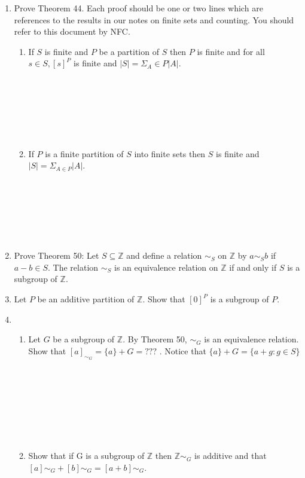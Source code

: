 \documentclass[11pt]{article}
\begin{document}
\begin{enumerate}
\newpage %
\item Prove Theorem 44. Each proof should be one or two lines which are references to the results in our notes on finite sets and counting. You should refer to this document by NFC.
\begin{enumerate}
\item If $S$ is finite and $P$ be a partition of $S$ then $P$ is finite and for all $s \in S, [s]^P$ is finite and $|S| = \Sigma_A \in P|A|$.
\\
\\
\\
\\
\\
\\
\\

\item If $P$ is a finite partition of $S$ into finite sets then $S$ is finite and $|S| = \Sigma_{A \in P}|A|$.
\\
\\
\\
\\
\\
\\
\\

\end{enumerate}

\newpage %
\item Prove Theorem 50: Let $S \subseteq \mathbb{Z}$ and define a relation $\sim_S$ on $\mathbb{Z}$ by $a \sim_S b$ if $a-b \in S$.  The relation $\sim_S$ is an equivalence relation on $\mathbb{Z}$ if and only if $S$ is a subgroup of $\mathbb{Z}$.

\newpage %
\item Let $P$ be an additive partition of $\mathbb{Z}$. Show that $[0]^P$ is a subgroup of $P$.


\newpage %
\item
\begin{enumerate}
\item Let $G$ be a subgroup of $\mathbb{Z}$. By Theorem 50, $\sim_G$ is an equivalence relation. Show that $[a]_{\sim_G} = \{a\}+G = ???$ . Notice that $\{a\} + G = \{a + g : g \in S\}$
\\
\\
\\
\\
\\
\\
\\
\\

\item Show that if G is a subgroup of $\mathbb{Z}$ then $\mathbb{Z}\sim_G$ is additive and that $[a]\sim_G + [b]\sim_G = [a + b]\sim_G$.
\\
\\
\\
\\
\\
\\
\\

\end{enumerate}


\end{enumerate} %
\end{document}
